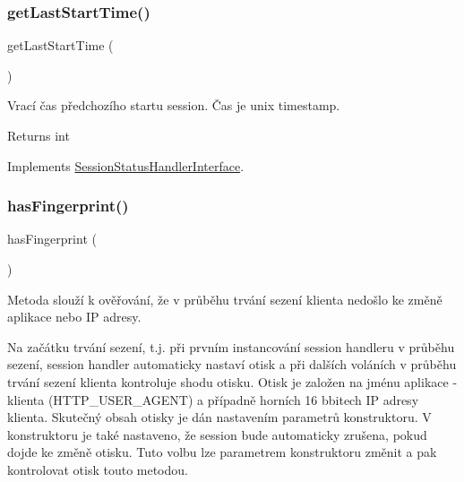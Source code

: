 \subsubsection{\texorpdfstring{get\+Last\+Start\+Time()}{getLastStartTime()}}
{\footnotesize\ttfamily get\+Last\+Start\+Time (\begin{DoxyParamCaption}{ }\end{DoxyParamCaption})}

Vrací čas předchozího startu session. Čas je unix timestamp.

\begin{DoxyReturn}{Returns}
int 
\end{DoxyReturn}


Implements \mbox{\hyperlink{interface_pes_1_1_session_1_1_session_status_handler_interface}{Session\+Status\+Handler\+Interface}}.

\mbox{\label{class_pes_1_1_session_1_1_session_status_handler_aa053bd6719cc91c4fa951aa9266748aa}} 
\subsubsection{\texorpdfstring{has\+Fingerprint()}{hasFingerprint()}}
{\footnotesize\ttfamily has\+Fingerprint (\begin{DoxyParamCaption}{ }\end{DoxyParamCaption})}

Metoda slouží k ověřování, že v průběhu trvání sezení klienta nedošlo ke změně aplikace nebo IP adresy.

Na začátku trvání sezení, t.\+j. při prvním instancování session handleru v průběhu sezení, session handler automaticky nastaví otisk a při dalších voláních v průběhu trvání sezení klienta kontroluje shodu otisku. Otisk je založen na jménu aplikace -\/ klienta (H\+T\+T\+P\+\_\+\+U\+S\+E\+R\+\_\+\+A\+G\+E\+NT) a případně horních 16 bbitech IP adresy klienta. Skutečný obsah otisky je dán nastavením parametrů konstruktoru. V konstruktoru je také nastaveno, že session bude automaticky zrušena, pokud dojde ke změně otisku. Tuto volbu lze parametrem konstruktoru změnit a pak kontrolovat otisk touto metodou.

